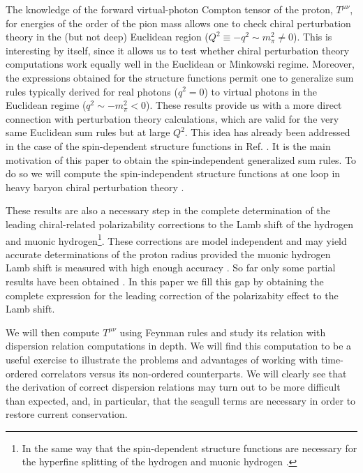 \documentclass[a4paper,12pt]{article}
\begin{document}
The knowledge of the forward virtual-photon Compton tensor of the proton, $T^{\mu\nu}$, 
for energies of the 
order of the pion mass allows one to check chiral perturbation theory 
in the (but not deep) Euclidean region ($Q^2 \equiv -q^2 \sim m_{\pi}^2 \not= 0$). 
This is interesting by itself, since it allows us to test whether chiral perturbation 
theory computations work equally well in the Euclidean or Minkowski regime. 
Moreover, the expressions obtained for the structure functions permit one to generalize 
sum rules typically derived for real photons ($q^2=0$) to virtual photons 
in the Euclidean regime ($q^2 \sim -m_{\pi}^2 <0$). 
These results provide us with a more direct connection with perturbation theory 
calculations, which are valid for the very same Euclidean sum rules but at large $Q^2$. This idea has 
already been addressed in the case of the spin-dependent structure 
functions in Ref. \cite{Ji:1999mr}. It is the main motivation of this paper 
to obtain the spin-independent generalized sum rules. To do 
so we will compute the spin-independent structure functions at one loop
in heavy baryon chiral perturbation theory \cite{Gasser:1983yg,HBET}.

These results are also a necessary step in the complete determination of the 
leading chiral-related polarizability corrections to the Lamb shift of the hydrogen and 
muonic hydrogen\footnote{In the same way that the spin-dependent structure 
functions are necessary for the hyperfine splitting of the 
hydrogen and muonic hydrogen \cite{Pineda:2002as}.}. 
These corrections are model independent and may yield    
accurate determinations of the proton radius provided the muonic 
hydrogen Lamb shift is measured with high enough accuracy \cite{Antognini:2005fe}. So far 
only some partial results have been obtained \cite{Pineda:2004mx}. 
In this paper we fill this gap by obtaining the complete expression for the 
leading correction of the polarizabity effect to the Lamb shift. 

We will then compute $T^{\mu\nu}$ using Feynman rules and study its 
relation with dispersion relation computations in depth.
We will find this computation to be a useful exercise to illustrate the problems 
and advantages of working with time-ordered correlators 
versus its non-ordered counterparts. We will clearly see 
that the derivation 
of correct dispersion relations may turn out to be more difficult than expected,
and, in particular, that the seagull terms are necessary in order to restore 
current conservation.
\end{document}

